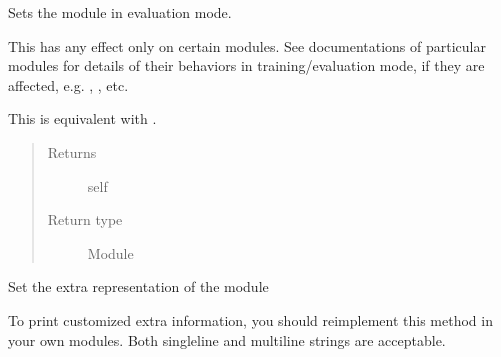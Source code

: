 \documentclass[letterpaper,10pt,english]{sphinxmanual}
\begin{document}
\begin{fulllineitems}
\begin{fulllineitems}
\label{\detokenize{api/dynamics:geology.metamodelling.dynamics.LatentSpaceDynamics.dump_patches}}
\end{fulllineitems}


\begin{fulllineitems}
\label{\detokenize{api/dynamics:geology.metamodelling.dynamics.LatentSpaceDynamics.eval}}
Sets the module in evaluation mode.

This has any effect only on certain modules. See documentations of
particular modules for details of their behaviors in training/evaluation
mode, if they are affected, e.g. , ,
etc.

This is equivalent with .
\begin{quote}\begin{description}
\item[{Returns}] \leavevmode
self

\item[{Return type}] \leavevmode
Module

\end{description}\end{quote}

\end{fulllineitems}


\begin{fulllineitems}
\label{\detokenize{api/dynamics:geology.metamodelling.dynamics.LatentSpaceDynamics.extra_repr}}
Set the extra representation of the module

To print customized extra information, you should reimplement
this method in your own modules. Both single\sphinxhyphen{}line and multi\sphinxhyphen{}line
strings are acceptable.

\end{fulllineitems}



\end{fulllineitems}
\end{document}
